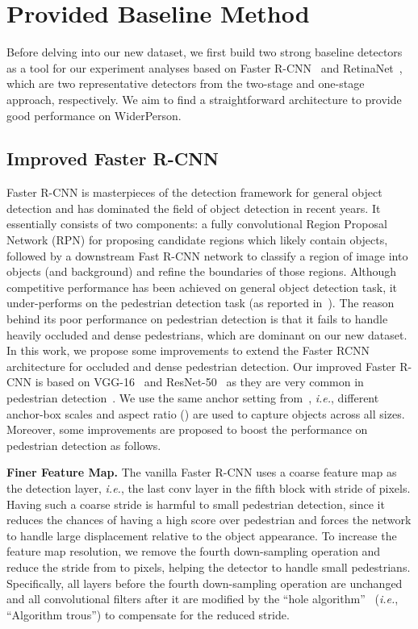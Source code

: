 \documentclass[journal]{IEEEtran}
\def\ie{{\em i.e.}}
\begin{document}
\section{Provided Baseline Method}\label{4}
Before delving into our new dataset, we first build two strong baseline detectors as a tool for our experiment analyses based on Faster R-CNN~\cite{DBLP:journals/pami/RenHG017} and RetinaNet~\cite{DBLP:conf/iccv/LinPRK17}, which are two representative detectors from the two-stage and one-stage approach, respectively. We aim to find a straightforward architecture to provide good performance on WiderPerson.

\subsection{Improved Faster R-CNN}
Faster R-CNN is masterpieces of the detection framework for general object detection and has dominated the field of object detection in recent years. It essentially consists of two components: a fully convolutional Region Proposal Network (RPN) for proposing candidate regions which likely contain objects, followed by a downstream Fast R-CNN network to classify a region of image into objects (and background) and refine the boundaries of those regions. Although competitive performance has been achieved on general object detection task, it under-performs on the pedestrian detection task (as reported in~\cite{DBLP:conf/eccv/ZhangLLH16}). The reason behind its poor performance on pedestrian detection is that it fails to handle heavily occluded and dense pedestrians, which are dominant on our new dataset. In this work, we propose some improvements to extend the Faster RCNN architecture for occluded and dense pedestrian detection. Our improved Faster R-CNN is based on VGG-16~\cite{DBLP:journals/corr/SimonyanZ14a} and ResNet-50~\cite{DBLP:conf/cvpr/HeZRS16} as they are very common in pedestrian detection~\cite{DBLP:conf/eccv/ZhangLLH16, DBLP:conf/cvpr/ZhangBS17, DBLP:conf/cvpr/MaoXJC17}. We use the same anchor setting from~\cite{DBLP:conf/cvpr/ZhangBS17}, \ie,  different anchor-box scales and  aspect ratio () are used to capture objects across all sizes. Moreover, some improvements are proposed to boost the performance on pedestrian detection as follows. 

{\flushleft \textbf{Finer Feature Map.}}
The vanilla Faster R-CNN uses a coarse feature map as the detection layer, \ie, the last conv layer in the fifth block with stride of  pixels. Having such a coarse stride is harmful to small pedestrian detection, since it reduces the chances of having a high score over pedestrian and forces the network to handle large displacement relative to the object appearance. To increase the feature map resolution, we remove the fourth down-sampling operation and reduce the stride from  to  pixels, helping the detector to handle small pedestrians. Specifically, all layers before the fourth down-sampling operation are unchanged and all convolutional filters after it are modified by the ``hole algorithm''~\cite{DBLP:conf/cvpr/LongSD15} (\ie, ``Algorithm  trous'') to compensate for the reduced stride.
\end{document}
